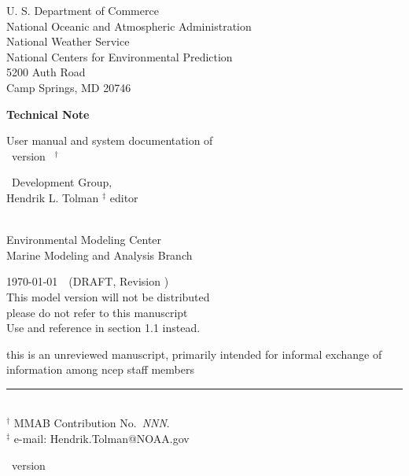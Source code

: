 
\pagestyle{empty}

\begin{center} 
U. S. Department of Commerce \\
National Oceanic and Atmospheric Administration \\
National Weather Service \\
National Centers for Environmental Prediction \\
5200 Auth Road \\
Camp Springs, MD 20746


\vspace{15mm}

{\bf Technical Note}

\vspace{15mm}

{\large User manual and system documentation of \\
\ww\ version \WWver\ $^\dag$} \\

\vspace{15mm}

\ww\ Development Group, \\
Hendrik L. Tolman $^\ddag$ editor\\
\strut \\
Environmental Modeling Center \\
Marine Modeling and Analysis Branch

\vfill

\today $\:\:\:$ (DRAFT, Revision \SVNRevision) \\
\vspace{\baselineskip}
This model version will not be distributed \\
{\sc please do not refer to this manuscript} \\
Use \cite{tol:MMAB09a} and reference in section 1.1 instead.


\vfill
{\sc this is an unreviewed manuscript, primarily intended for informal
exchange of information among ncep staff members}

\end{center}
\noindent \rule{140mm}{0.5mm} \\
{\small $^\dag$ MMAB Contribution No.~{\it NNN}. \\
$^\ddag$ e-mail: Hendrik.Tolman@NOAA.gov}

\bpage

\pb

         { \hspace{20.5mm} \ws\ version \WWver}
\pagestyle{myheadings}
\setcounter{page}{1}
\tableofcontents



\pb
\pagestyle{myheadings}

